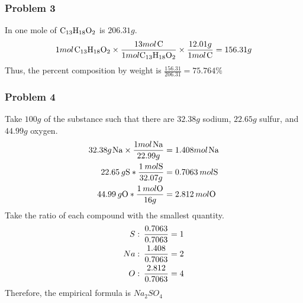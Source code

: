 \documentclass{article}
\begin{document}
\subsubsection*{Problem 3}
In one mole of \(\ce{C_{13}H_{18}O_2}\) is \(206.31g\).
\begin{equation}
\begin{aligned}
    1mol\hspace{0.1em}\ce{C_{13}H_{18}O_2} \times \frac{13mol\hspace{0.1em}\ce{C}}{1mol\ce{C_{13}H_{18}O_2}} \times \frac{12.01g}{1mol\hspace{0.1em}\ce{C}} = 156.31g
\end{aligned}
\end{equation}
Thus, the percent composition by weight is \(\frac{156.31}{206.31} = 75.764\%\)
\subsubsection*{Problem 4}
Take \(100g\) of the substance such that there are \(32.38g\) sodium, \(22.65g\) sulfur, and \(44.99g\) oxygen. 
\begin{equation}
\begin{aligned}
    32.38g\hspace{0.1em}\ce{Na} \times \frac{1mol\hspace{0.1em}\ce{Na}}{22.99g} &= 1.408mol\hspace{0.1em}\ce{Na} \\
    22.65\hspace{0.2em}g \ce{S} * \frac{1\hspace{0.2em}mol\ce{S}}{32.07g} &= 0.7063 \hspace{0.2em}mol\ce{S}\\
    44.99\hspace{0.2em}g\ce{O} * \frac{1\hspace{0.2em}mol\ce{O}}{16 g} &= 2.812\hspace{0.2em}mol \ce{O}
\end{aligned}
\end{equation}
Take the ratio of each compound with the smallest quantity. 
\begin{equation}
\begin{split}
    S:\hspace{0.2em}\frac{0.7063}{0.7063} = 1 \\
    Na:\hspace{0.2em}\frac{1.408}{0.7063} = 2 \\
    O:\hspace{0.2em}\frac{2.812}{0.7063} = 4
\end{split}
\end{equation}
Therefore, the empirical formula is \(Na_{2}SO_{4}\)
\end{document}
